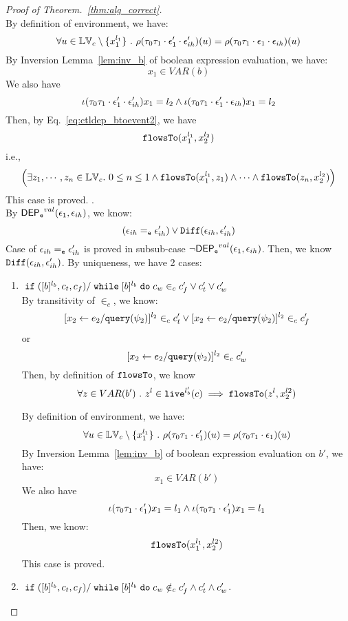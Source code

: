 \begin{proof}[Proof of Theorem.~\ref{thm:alg_correct}]
\[ \]
 By definition of environment, we have:
\[
  \forall u \in \mathbb{LV}_c \setminus \{x_1^{l_1}\} ~.~
  \rho(\mathtt{\tau}_0 \mathtt{\tau}_1 \cdot \mathtt{\epsilon}_1' \cdot \mathtt{\epsilon}_{ih}') (u) =  
  \rho(\mathtt{\tau}_0 \mathtt{\tau}_1 \cdot \mathtt{\epsilon}_1 \cdot \mathtt{\epsilon}_{ih}) (u)
\]
%
By {Inversion Lemma~\ref{lem:inv_b}} of boolean expression evaluation, we have:
 \[
  x_1 \in VAR(b)
 \]
 We also have 
 $$
 \iota(\mathtt{\tau}_0 \mathtt{\tau}_1 \cdot \mathtt{\epsilon}_1' \cdot \mathtt{\epsilon}_{ih}') x_1 = l_2
 \land 
 \iota(\mathtt{\tau}_0 \mathtt{\tau}_1 \cdot \mathtt{\epsilon}_1' \cdot \mathtt{\epsilon}_{ih}) x_1 = l_2
 $$
 Then, by Eq.~\ref{eq:ctldep_btoevent2}, we have
 \[
 \mathtt{flowsTo}(x_1^{l_1}, x_2^{l_2})
 \]
 i.e.,
 \[
 \Big( \exists z_1, \cdots, z_n \in \mathbb{LV}_{{c}}. ~ 0 \leq n \leq 1 \land
  \mathtt{flowsTo}(x_1^{l_1}, z_1) 
  \land \cdots \land \mathtt{flowsTo}(z_n, x_2^{l_2}) \Big)
 \]
  This case is proved.
%
.
\\
By $\mathsf{DEP_{\mathtt{e}}}^{val}(\mathtt{\epsilon}_1, \mathtt{\epsilon}_{ih})$, we know:
\[
  (\mathtt{\epsilon}_{ih} =_{\mathtt{e}} \mathtt{\epsilon}_{ih}') \lor \mathtt{Diff}(\mathtt{\epsilon}_{ih}, \mathtt{\epsilon}_{ih}')
\]
Case of $\mathtt{\epsilon}_{ih} =_{\mathtt{e}} \mathtt{\epsilon}_{ih}'$ is proved in subsub-case $\neg \mathsf{DEP_{\mathtt{e}}}^{val}(\mathtt{\epsilon}_1, \mathtt{\epsilon}_{ih})$.
%
Then, we know $\mathtt{Diff}(\mathtt{\epsilon}_{ih}, \mathtt{\epsilon}_{ih}')$. By uniqueness, we have 2 cases:
\begin{enumerate}
  \item $\;\mathtt{if}\;([b]{}^{l_b}, c_t, c_f) / \;\mathtt{while}\; [b]{}^{l_b} \;\mathtt{do}\; c_w \in_c c_f' \lor c_t' \lor c_w'$
  \\
  By transitivity of $\in_c$, we know:
  \[
  [\mathrel{ {x}_2 \leftarrow e_2 / {\tt query}(\psi_2) }]^{l_2} \in_c c_t'
  \lor
  [\mathrel{ {x}_2 \leftarrow e_2 / {\tt query}(\psi_2) }]^{l_2} \in_c c_f'
\]
or
\[
    [\mathrel{ {x}_2 \leftarrow e_2 / {\tt query}(\psi_2) }]^{l_2} \in_c c_w'
\]
%
Then, by definition of $\mathtt{flowsTo}$, we know
\begin{equation}
 \forall z \in VAR(b') ~.~ z^l \in \mathtt{live}^{l_b'}(c) \implies \mathtt{flowsTo}(z^l, x_2^{l2})
\end{equation} 

 By definition of environment, we have:
\[
  \forall u \in \mathbb{LV}_c \setminus \{x_1^{l_1}\} ~.~
  \rho(\mathtt{\tau}_0 \mathtt{\tau}_1 \cdot \mathtt{\epsilon}_1') (u) =  
  \rho(\mathtt{\tau}_0 \mathtt{\tau}_1 \cdot \mathtt{\epsilon}_1) (u)
\]
%
By {Inversion Lemma~\ref{lem:inv_b}} of boolean expression evaluation on $b'$, we have:
 \[
  x_1 \in VAR(b')
 \]
 We also have 
 $$
 \iota(\mathtt{\tau}_0 \mathtt{\tau}_1 \cdot \mathtt{\epsilon}_1') x_1 = l_1
 \land 
 \iota(\mathtt{\tau}_0 \mathtt{\tau}_1 \cdot \mathtt{\epsilon}_1') x_1 = l_1
 $$
 Then, we know:
 \[
 \mathtt{flowsTo}(x_1^{l_1}, x_2^{l2})
 \]
 This case is proved.
\item $\;\mathtt{if}\;([b]{}^{l_b}, c_t, c_f) / \;\mathtt{while}\; [b]{}^{l_b} \;\mathtt{do}\; c_w \notin_c c_f' \land c_t' \land c_w'$.


\end{enumerate}
\end{proof}
